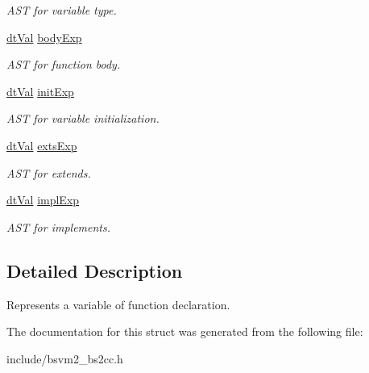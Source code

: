 \begin{DoxyCompactItemize}
\begin{DoxyCompactList}\small\item\em A\-S\-T for variable type. \end{DoxyCompactList}\item 
\hypertarget{structBS2CC__VarInfo__s_abba20a49e11c6c38bc2cc529106d4e44}{\hyperlink{unionBGBDT__TagValue__s}{dt\-Val} \hyperlink{structBS2CC__VarInfo__s_abba20a49e11c6c38bc2cc529106d4e44}{body\-Exp}}\label{structBS2CC__VarInfo__s_abba20a49e11c6c38bc2cc529106d4e44}

\begin{DoxyCompactList}\small\item\em A\-S\-T for function body. \end{DoxyCompactList}\item 
\hypertarget{structBS2CC__VarInfo__s_ae16b8ebd09a43c9d7a56660afd5cf78b}{\hyperlink{unionBGBDT__TagValue__s}{dt\-Val} \hyperlink{structBS2CC__VarInfo__s_ae16b8ebd09a43c9d7a56660afd5cf78b}{init\-Exp}}\label{structBS2CC__VarInfo__s_ae16b8ebd09a43c9d7a56660afd5cf78b}

\begin{DoxyCompactList}\small\item\em A\-S\-T for variable initialization. \end{DoxyCompactList}\item 
\hypertarget{structBS2CC__VarInfo__s_a661b59a16b3fb519bbbcf370454bb811}{\hyperlink{unionBGBDT__TagValue__s}{dt\-Val} \hyperlink{structBS2CC__VarInfo__s_a661b59a16b3fb519bbbcf370454bb811}{exts\-Exp}}\label{structBS2CC__VarInfo__s_a661b59a16b3fb519bbbcf370454bb811}

\begin{DoxyCompactList}\small\item\em A\-S\-T for extends. \end{DoxyCompactList}\item 
\hypertarget{structBS2CC__VarInfo__s_a1c85462a3664c79d1ace9eaf7c59f8aa}{\hyperlink{unionBGBDT__TagValue__s}{dt\-Val} \hyperlink{structBS2CC__VarInfo__s_a1c85462a3664c79d1ace9eaf7c59f8aa}{impl\-Exp}}\label{structBS2CC__VarInfo__s_a1c85462a3664c79d1ace9eaf7c59f8aa}

\begin{DoxyCompactList}\small\item\em A\-S\-T for implements. \end{DoxyCompactList}\end{DoxyCompactItemize}


\subsection{Detailed Description}
Represents a variable of function declaration. 

The documentation for this struct was generated from the following file\-:\begin{DoxyCompactItemize}
\item 
include/bsvm2\-\_\-bs2cc.\-h\end{DoxyCompactItemize}
